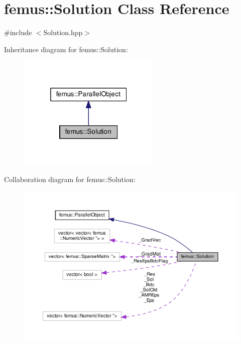 \hypertarget{classfemus_1_1_solution}{}\section{femus\+:\+:Solution Class Reference}
\label{classfemus_1_1_solution}


{\ttfamily \#include $<$Solution.\+hpp$>$}



Inheritance diagram for femus\+:\+:Solution\+:
\nopagebreak
\begin{figure}[H]
\begin{center}
\leavevmode
\includegraphics[width=193pt]{classfemus_1_1_solution__inherit__graph}
\end{center}
\end{figure}


Collaboration diagram for femus\+:\+:Solution\+:
\nopagebreak
\begin{figure}[H]
\begin{center}
\leavevmode
\includegraphics[width=350pt]{classfemus_1_1_solution__coll__graph}
\end{center}
\end{figure}
